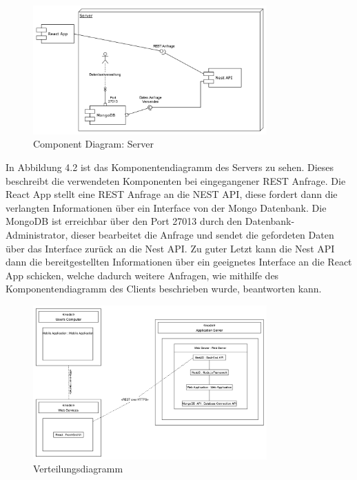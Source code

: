 \begin{figure}[!h]
    \centering
    \includegraphics[width=0.8\textwidth]{./UML_Diagrams/ComponentDiagramServer.png}
    \caption{Component Diagram: Server}
    \label{fig:ComponentDiagramServer}
\end{figure}
In Abbildung 4.2 ist das Komponentendiagramm des Servers zu sehen.
Dieses beschreibt die verwendeten Komponenten bei eingegangener REST Anfrage.
Die React App stellt eine REST Anfrage an die NEST API, diese fordert dann die verlangten Informationen über ein Interface von der Mongo Datenbank.
Die MongoDB ist erreichbar über den Port 27013 durch den Datenbank-Administrator, dieser bearbeitet die Anfrage und sendet die gefordeten Daten über das Interface zurück an die Nest API.
Zu guter Letzt kann die Nest API dann die bereitgestellten Informationen über ein geeignetes Interface an die React App schicken, welche dadurch weitere Anfragen, wie mithilfe des Komponentendiagramm des Clients beschrieben wurde, beantworten kann.



\begin{figure}[!h]
    \centering
    \includegraphics[width=0.8\textwidth]{./UML_Diagrams/Verteilungsdiagramm.png}
    \caption{Verteilungsdiagramm}
    \label{fig:Verteilungsdiagramm}
\end{figure}

